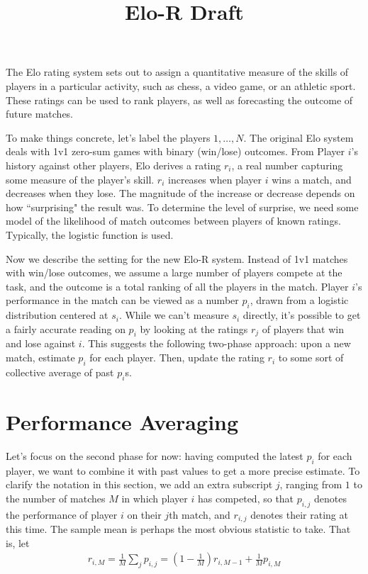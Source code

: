 \documentclass{article}
\title{Elo-R Draft}
\begin{document}
\maketitle

The Elo rating system sets out to assign a quantitative measure of the skills of players in a particular activity, such as chess, a video game, or an athletic sport. These ratings can be used to rank players, as well as forecasting the outcome of future matches.

To make things concrete, let's label the players $1,\ldots,N$. The original Elo system deals with 1v1 zero-sum games with binary (win/lose) outcomes. From Player $i$'s history against other players, Elo derives a rating $r_i$, a real number capturing some measure of the player's skill. $r_i$ increases when player $i$ wins a match, and decreases when they lose. The magnitude of the increase or decrease depends on how ``surprising" the result was. To determine the level of surprise, we need some model of the likelihood of match outcomes between players of known ratings. Typically, the logistic function is used.

Now we describe the setting for the new Elo-R system. Instead of 1v1 matches with win/lose outcomes, we assume a large number of players compete at the task, and the outcome is a total ranking of all the players in the match. Player $i$'s performance in the match can be viewed as a number $p_i$, drawn from a logistic distribution centered at $s_i$. While we can't measure $s_i$ directly, it's possible to get a fairly accurate reading on $p_i$ by looking at the ratings $r_j$ of players that win and lose against $i$. This suggests the following two-phase approach: upon a new match, estimate $p_i$ for each player. Then, update the rating $r_i$ to some sort of collective average of past $p_i$s.

\section{Performance Averaging}

Let's focus on the second phase for now: having computed the latest $p_i$ for each player, we want to combine it with past values to get a more precise estimate. To clarify the notation in this section, we add an extra subscript $j$, ranging from $1$ to the number of matches $M$ in which player $i$ has competed, so that $p_{i,j}$ denotes the performance of player $i$ on their $j$th match, and $r_{i,j}$ denotes their rating at this time. The sample mean is perhaps the most obvious statistic to take. That is, let
\begin{align}
r_{i,M} = \frac{1}{M} \sum_j p_{i,j} = \left(1 - \frac{1}{M}\right) r_{i,M-1} +  \frac{1}{M} p_{i,M}
\end{align}
\end{document}
